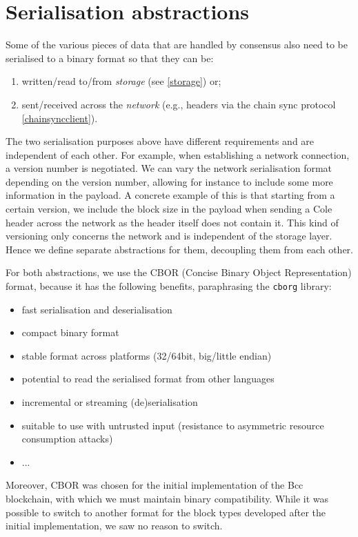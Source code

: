 \chapter{Serialisation abstractions}
\label{serialisation}

Some of the various pieces of data that are handled by consensus also need to be
serialised to a binary format so that they can be:

\begin{enumerate}
\item written/read to/from \emph{storage} (see \cref{storage}) or;
\item sent/received across the \emph{network} (e.g., headers via the chain sync
  protocol \cref{chainsyncclient}).
\end{enumerate}

The two serialisation purposes above have different requirements and are
independent of each other. For example, when establishing a network connection,
a version number is negotiated. We can vary the network serialisation format
depending on the version number, allowing for instance to include some more
information in the payload. A concrete example of this is that starting from a
certain version, we include the block size in the payload when sending a
Cole header across the network as the header
itself does not contain it. This kind of versioning only concerns the network
and is independent of the storage layer. Hence we define separate abstractions
for them, decoupling them from each other.

For both abstractions, we use the CBOR (Concise Binary Object
Representation) format, because it has the following
benefits, paraphrasing the \texttt{cborg} library:
\begin{itemize}
\item fast serialisation and deserialisation
\item compact binary format
\item stable format across platforms (32/64bit, big/little endian)
\item potential to read the serialised format from other languages
\item incremental or streaming (de)serialisation
\item suitable to use with untrusted input (resistance to asymmetric resource consumption attacks)
\item ...
\end{itemize}
Moreover, CBOR was chosen for the initial implementation of the Bcc
blockchain, with which we must maintain binary compatibility.
While it was possible to switch to another format for the block types developed
after the initial implementation, we saw no reason to switch.

